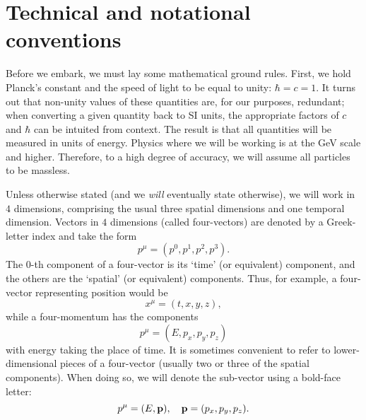 \documentclass[12pt,twoside,class=../reedthesis, crop=false]{standalone}
\begin{document}
\section{Technical and notational conventions}
	Before we embark, we must lay some mathematical ground rules. First, we hold Planck's constant and the speed of light to be equal to unity: $\hbar = c = 1$. It turns out that non-unity values of these quantities are, for our purposes, redundant; when converting a given quantity back to SI units, the appropriate factors of $c$ and $\hbar$ can be intuited from context. The result is that all quantities will be measured in units of energy. Physics where we will be working is at the \si{\giga\electronvolt} scale and higher. Therefore, to a high degree of accuracy, we will assume all particles to be massless.

	Unless otherwise stated (and we \textit{will} eventually state otherwise), we will work in $4$ dimensions, comprising the usual three spatial dimensions and one temporal dimension. Vectors in $4$ dimensions (called four-vectors) are denoted by a Greek-letter index and take the form
	\begin{equation}
		p^\mu = (p^0, p^1, p^2, p^3).
	\end{equation}
	The $0$-th component of a four-vector is its `time' (or equivalent) component, and the others are the `spatial' (or equivalent) components. Thus, for example, a four-vector representing position would be
	\begin{equation}
		x^\mu = (t, x, y, z),
	\end{equation}
	while a four-momentum has the components
	\begin{equation}
		p^\mu = (E, p_x, p_y, p_z)
	\end{equation}
	with energy taking the place of time. It is sometimes convenient to refer to lower-dimensional pieces of a four-vector (usually two or three of the spatial components). When doing so, we will denote the sub-vector using a bold-face letter:
	\begin{equation}
		p^\mu = (E, \vb{p}), \quad \vb{p} = (p_x, p_y, p_z).
	\end{equation}
\end{document}
